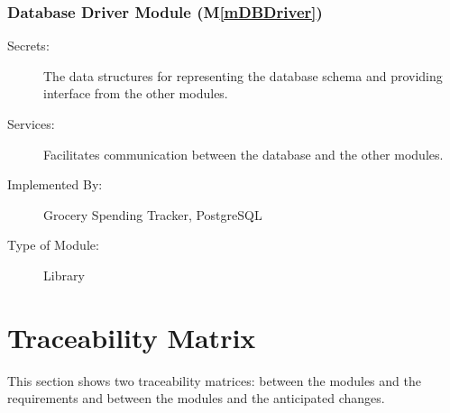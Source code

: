 \documentclass[12pt, titlepage]{article}
\newcommand{\mref}[1]{M\ref{#1}}
\begin{document}
\subsubsection{Database Driver Module (\mref{mDBDriver})}

\begin{description}
\item[Secrets:] The data structures for representing the database schema and providing interface from the other modules.
\item[Services:] Facilitates communication between the database and the other modules.
\item[Implemented By:] Grocery Spending Tracker, PostgreSQL
\item[Type of Module:] Library
\end{description}

\section{Traceability Matrix} \label{SecTM}

This section shows two traceability matrices: between the modules and the
requirements and between the modules and the anticipated changes.
\end{document}
